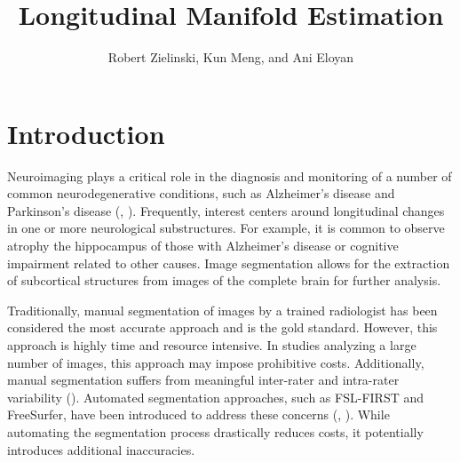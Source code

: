 \documentclass[11pt,reqno]{article}
\theoremstyle{definition}
\begin{document}
\title{Longitudinal Manifold Estimation}
\author[1]{Robert Zielinski, Kun Meng, and Ani Eloyan}


\maketitle

\doublespacing


\section{Introduction}

Neuroimaging plays a critical role in the diagnosis and monitoring of a number of common neurodegenerative conditions, such as Alzheimer's disease and Parkinson's disease (\cite{knopmanAlzheimerDisease2021}, \cite{poeweParkinsonDisease2017}). Frequently, interest centers around longitudinal changes in one or more neurological substructures. For example, it is common to observe atrophy the hippocampus of those with Alzheimer's disease or cognitive impairment related to other causes. Image segmentation allows for the extraction of subcortical structures from images of the complete brain for further analysis.

Traditionally, manual segmentation of images by a trained radiologist has been considered the most accurate approach and is the gold standard. However, this approach is highly time and resource intensive. In studies analyzing a large number of images, this approach may impose prohibitive costs. Additionally, manual segmentation suffers from meaningful inter-rater and intra-rater variability (\cite{boccardiSurveyProtocolsManual2011}). Automated segmentation approaches, such as FSL-FIRST and FreeSurfer, have been introduced to address these concerns (\cite{patenaudeBayesianModelShape2011}, \cite{reuterWithinsubjectTemplateEstimation2012}). While automating the segmentation process drastically reduces costs, it potentially introduces additional inaccuracies.
\end{document}
